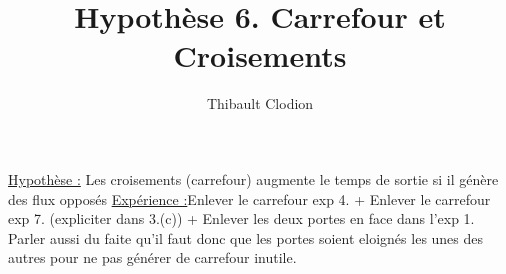 \documentclass[12pt]{article}
\title{Hypothèse 6. Carrefour et Croisements}
\author{Thibault Clodion}
\begin{document}
\maketitle %

\underline{Hypothèse :} Les croisements (carrefour) augmente le temps de sortie si il génère des flux opposés
\newline\newline
\underline{Expérience :}Enlever le carrefour exp 4. + Enlever le carrefour exp 7. (expliciter dans 3.(c)) + Enlever les deux portes en face dans l'exp 1.
\newline
Parler aussi du faite qu'il faut donc que les portes soient eloignés les unes des autres pour ne pas générer de carrefour inutile.
\newline
\end{document}
